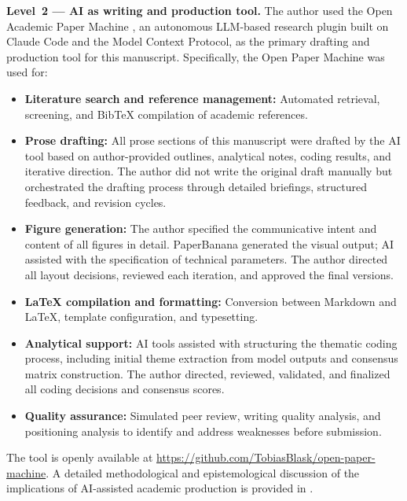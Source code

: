\documentclass[preprint,review,12pt]{elsarticle}
\begin{document}
\textbf{Level~2 --- AI as writing and production tool.} The author used the Open Academic Paper Machine \citep{blask2026openpapermachine}, an autonomous LLM-based research plugin built on Claude Code and the Model Context Protocol, as the primary drafting and production tool for this manuscript. Specifically, the Open Paper Machine was used for:
\begin{itemize}
  \item \textbf{Literature search and reference management:} Automated retrieval, screening, and BibTeX compilation of academic references.
  \item \textbf{Prose drafting:} All prose sections of this manuscript were drafted by the AI tool based on author-provided outlines, analytical notes, coding results, and iterative direction. The author did not write the original draft manually but orchestrated the drafting process through detailed briefings, structured feedback, and revision cycles.
  \item \textbf{Figure generation:} The author specified the communicative intent and content of all figures in detail. PaperBanana \citep{zhu2026paperbanana} generated the visual output; AI assisted with the specification of technical parameters. The author directed all layout decisions, reviewed each iteration, and approved the final versions.
  \item \textbf{\LaTeX{} compilation and formatting:} Conversion between Markdown and \LaTeX{}, template configuration, and typesetting.
  \item \textbf{Analytical support:} AI tools assisted with structuring the thematic coding process, including initial theme extraction from model outputs and consensus matrix construction. The author directed, reviewed, validated, and finalized all coding decisions and consensus scores.
  \item \textbf{Quality assurance:} Simulated peer review, writing quality analysis, and positioning analysis to identify and address weaknesses before submission.
\end{itemize}
The tool is openly available at \url{https://github.com/TobiasBlask/open-paper-machine}. A detailed methodological and epistemological discussion of the implications of AI-assisted academic production is provided in \citet{blask2026orchestrator}.
\end{document}
